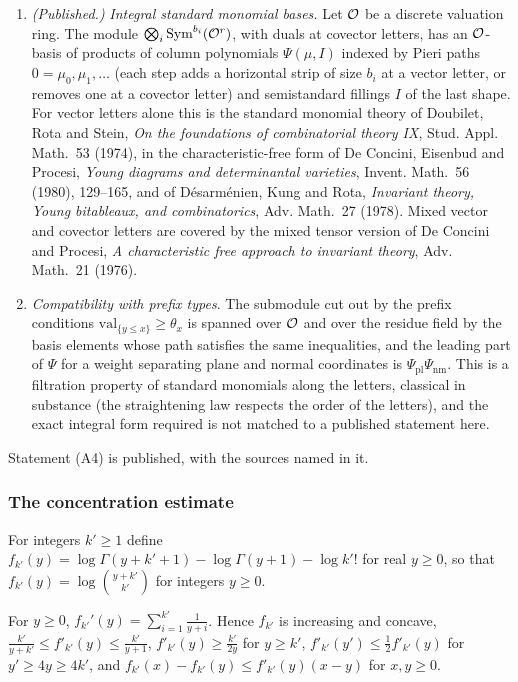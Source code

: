 \begin{enumerate}[label=(A\arabic*),start=4,leftmargin=*]
\item \emph{(Published.)} \emph{Integral standard monomial bases.} Let $\mathcal O$ be a discrete valuation ring. The module $\bigotimes_i\mathrm{Sym}^{b_i}(\mathcal O^r)$, with duals at covector letters, has an $\mathcal O$-basis of products of column polynomials $\Psi(\mu,I)$ indexed by Pieri paths $0=\mu_0,\mu_1,\dots$ (each step adds a horizontal strip of size $b_i$ at a vector letter, or removes one at a covector letter) and semistandard fillings $I$ of the last shape. For vector letters alone this is the standard monomial theory of Doubilet, Rota and Stein, \emph{On the foundations of combinatorial theory IX}, Stud. Appl. Math.~53 (1974), in the characteristic-free form of De Concini, Eisenbud and Procesi, \emph{Young diagrams and determinantal varieties}, Invent. Math.~56 (1980), 129--165, and of D\'esarm\'enien, Kung and Rota, \emph{Invariant theory, Young bitableaux, and combinatorics}, Adv. Math.~27 (1978). Mixed vector and covector letters are covered by the mixed tensor version of De Concini and Procesi, \emph{A characteristic free approach to invariant theory}, Adv. Math.~21 (1976).
\item \emph{Compatibility with prefix types}. The submodule cut out by the prefix conditions $\mathrm{val}_{\{y\le x\}}\ge\theta_x$ is spanned over $\mathcal O$ and over the residue field by the basis elements whose path satisfies the same inequalities, and the leading part of $\Psi$ for a weight separating plane and normal coordinates is $\Psi_{\mathrm{pl}}\Psi_{\mathrm{nm}}$. This is a filtration property of standard monomials along the letters, classical in substance (the straightening law respects the order of the letters), and the exact integral form required is not matched to a published statement here.
\end{enumerate}

Statement (A4) is published, with the sources named in it. 

\subsubsection{The concentration estimate}

For integers $k'\ge1$ define $f_{k'}(y)=\log\Gamma(y+k'+1)-\log\Gamma(y+1)-\log k'!$ for real $y\ge0$, so that $f_{k'}(y)=\log\binom{y+k'}{k'}$ for integers $y\ge0$.

\begin{lemma}\label{w1:lem:fT}
For $y\ge0$, $f_{k'}'(y)=\sum_{i=1}^{k'}\frac1{y+i}$. Hence $f_{k'}$ is increasing and concave, $\frac{k'}{y+k'}\le f'_{k'}(y)\le\frac{k'}{y+1}$, $f'_{k'}(y)\ge\frac{k'}{2y}$ for $y\ge k'$, $f'_{k'}(y')\le\frac12f'_{k'}(y)$ for $y'\ge4y\ge4k'$, and $f_{k'}(x)-f_{k'}(y)\le f'_{k'}(y)(x-y)$ for $x,y\ge0$.
\end{lemma}

